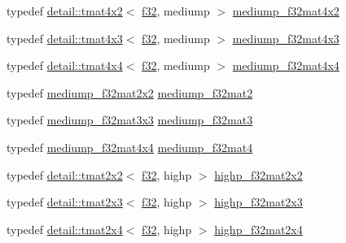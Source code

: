 \begin{DoxyCompactItemize}
\item 
typedef \hyperlink{structglm_1_1detail_1_1tmat4x2}{detail\+::tmat4x2}$<$ \hyperlink{group__gtc__type__precision_ga0ec999b57f5330d9021256e96038df04}{f32}, mediump $>$ \hyperlink{group__gtc__type__precision_ga3400d5463f0a58cf3959406aa2b69f72}{mediump\+\_\+f32mat4x2}
\item 
typedef \hyperlink{structglm_1_1detail_1_1tmat4x3}{detail\+::tmat4x3}$<$ \hyperlink{group__gtc__type__precision_ga0ec999b57f5330d9021256e96038df04}{f32}, mediump $>$ \hyperlink{group__gtc__type__precision_ga31635d753ab8a19fdaa80d2b89e90c54}{mediump\+\_\+f32mat4x3}
\item 
typedef \hyperlink{structglm_1_1detail_1_1tmat4x4}{detail\+::tmat4x4}$<$ \hyperlink{group__gtc__type__precision_ga0ec999b57f5330d9021256e96038df04}{f32}, mediump $>$ \hyperlink{group__gtc__type__precision_ga8f83086fffe71f9cd15e75a1de101ba6}{mediump\+\_\+f32mat4x4}
\item 
typedef \hyperlink{group__gtc__type__precision_ga23c9239d6aa9b41c3d2145e2faa81edb}{mediump\+\_\+f32mat2x2} \hyperlink{group__gtc__type__precision_ga103735a38477f7c389b36aae0fbdf274}{mediump\+\_\+f32mat2}
\item 
typedef \hyperlink{group__gtc__type__precision_gad4d01189a1462366b143c5cbc3de0ea9}{mediump\+\_\+f32mat3x3} \hyperlink{group__gtc__type__precision_gae263a08ef179894fdd36f9a51698c4ab}{mediump\+\_\+f32mat3}
\item 
typedef \hyperlink{group__gtc__type__precision_ga8f83086fffe71f9cd15e75a1de101ba6}{mediump\+\_\+f32mat4x4} \hyperlink{group__gtc__type__precision_ga56bd98ec31b6abc0315d688d4ecd94a0}{mediump\+\_\+f32mat4}
\item 
typedef \hyperlink{structglm_1_1detail_1_1tmat2x2}{detail\+::tmat2x2}$<$ \hyperlink{group__gtc__type__precision_ga0ec999b57f5330d9021256e96038df04}{f32}, highp $>$ \hyperlink{group__gtc__type__precision_gaf3a2cc948ca6fd168391138ce6fdd100}{highp\+\_\+f32mat2x2}
\item 
typedef \hyperlink{structglm_1_1detail_1_1tmat2x3}{detail\+::tmat2x3}$<$ \hyperlink{group__gtc__type__precision_ga0ec999b57f5330d9021256e96038df04}{f32}, highp $>$ \hyperlink{group__gtc__type__precision_ga53613c1b93f81207065a8a935ff02a81}{highp\+\_\+f32mat2x3}
\item 
typedef \hyperlink{structglm_1_1detail_1_1tmat2x4}{detail\+::tmat2x4}$<$ \hyperlink{group__gtc__type__precision_ga0ec999b57f5330d9021256e96038df04}{f32}, highp $>$ \hyperlink{group__gtc__type__precision_ga9689dbe21bc976ca8069c63300b5887e}{highp\+\_\+f32mat2x4}

\end{DoxyCompactItemize}
